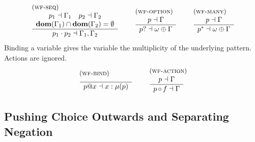 \documentclass{article}
\makeatletter
\newcommand{\rulename}{\textsc}
\newcommand{\irule}[3]{\begin{array}{l}{~\small\mbox{(\rulename{#1})}}\\\;\frac{\begin{array}{c}#2\end{array}}{\begin{array}{l}#3\end{array}}\end{array}}
\newcommand{\pseq}[2]{\ensuremath{#1 \cdot #2}}
\newcommand{\maybe}[1]{\ensuremath{#1?}}
\newcommand{\many}[1]{\ensuremath{#1^*}}
\newcommand{\bind}[2]{\ensuremath{#1@#2}}
\newcommand{\paction}[2]{\ensuremath{#1\mathop{\circ} #2}}
\makeatother
\begin{document}
\[
  \begin{array}{c}
    \irule{wf-seq}{
    p_1 \dashv \Gamma_1\quad
    p_2 \dashv \Gamma_2\\
    \mathbf{dom}(\Gamma_1) \cap \mathbf{dom}(\Gamma_2) = \emptyset
    }{
    \pseq{p_1}{p_2} \dashv \Gamma_1, \Gamma_2
    }
    \quad
    \irule{wf-option}{
    p \dashv \Gamma
    }{
    \maybe{p} \dashv \omega \oplus \Gamma
    }
    \quad
    \irule{wf-many}{
    p \dashv \Gamma
    }{
    \many{p} \dashv \omega \oplus \Gamma
    }
  \end{array}
\]
%
Binding a variable gives the variable the multiplicity of the
underlying pattern. Actions are ignored.
\[
  \begin{array}{c}
    \irule{wf-bind}{
    }{
    \bind{p}{x} \dashv x : \mu(p)
    }
    \quad
    \irule{wf-action}{
    p \dashv \Gamma
    }{
    \paction{p}{f} \dashv \Gamma
    }
  \end{array}
\]

\subsection{Pushing Choice Outwards and Separating Negation}
\end{document}

